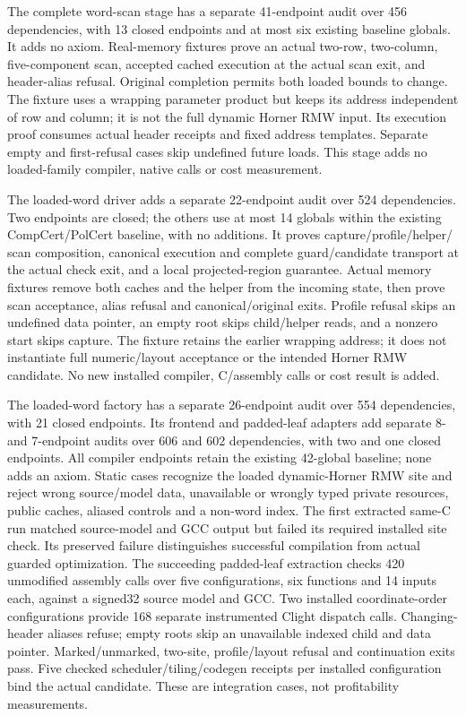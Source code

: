 The complete word-scan stage has a separate 41-endpoint audit over 456
dependencies, with 13 closed endpoints and at most six existing baseline globals.
It adds no axiom. Real-memory fixtures prove an actual two-row, two-column,
five-component scan, accepted cached execution at the actual scan exit, and
header-alias refusal. Original completion permits both loaded bounds to change.
The fixture uses a wrapping parameter product but keeps its address independent
of row and column; it is not the full dynamic Horner RMW input. Its execution
proof consumes actual header receipts and fixed address templates. Separate
empty and first-refusal cases skip undefined future loads. This stage adds no
loaded-family compiler, native calls or cost measurement.

The loaded-word driver adds a separate 22-endpoint audit over 524 dependencies.
Two endpoints are closed; the others use at most 14 globals within the existing
CompCert/PolCert baseline, with no additions. It proves capture/profile/helper/
scan composition, canonical execution and complete guard/candidate transport
at the actual check exit, and a local projected-region guarantee. Actual memory
fixtures remove both caches and the helper from the incoming state, then prove
scan acceptance, alias refusal and canonical/original exits. Profile refusal
skips an undefined data pointer, an empty root skips child/helper reads, and a
nonzero start skips capture. The fixture retains the earlier wrapping address;
it does not instantiate full numeric/layout acceptance or the intended Horner
RMW candidate. No new installed compiler, C/assembly calls or cost result is added.

The loaded-word factory has a separate 26-endpoint audit over 554 dependencies,
with 21 closed endpoints. Its frontend and padded-leaf adapters add separate
8- and 7-endpoint audits over 606 and 602 dependencies, with two and one closed
endpoints. All compiler endpoints retain the existing 42-global baseline; none
adds an axiom. Static cases recognize the loaded dynamic-Horner RMW site and
reject wrong source/model data, unavailable or wrongly typed private resources,
public caches, aliased controls and a non-word index. The first extracted
same-C run matched source-model and GCC output but failed its required installed
site check. Its preserved failure distinguishes successful compilation from
actual guarded optimization. The succeeding padded-leaf extraction checks
420 unmodified assembly calls over five configurations, six functions and
14 inputs each, against a signed32 source model and GCC. Two installed
coordinate-order configurations provide 168 separate instrumented Clight
dispatch calls. Changing-header aliases refuse; empty roots skip an unavailable
indexed child and data pointer. Marked/unmarked, two-site, profile/layout refusal
and continuation exits pass. Five checked scheduler/tiling/codegen receipts per
installed configuration bind the actual candidate. These are integration
cases, not profitability measurements.

